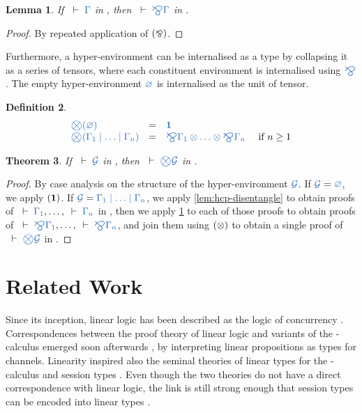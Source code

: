 \documentclass[copyright,creativecommons]{eptcs}
\newtheorem{lemma}{Lemma}[section]
\newtheorem{theorem}[lemma]{Theorem}
\newtheorem{definition}[lemma]{Definition}
\begin{document}
\begin{lemma}\label{lem:cp-bigparr}
  If $\seq{\Gamma}$ in \cp, then $\seq{\bigparr\Gamma}$ in \cp.
\end{lemma} 
\begin{proof}
  By repeated application of $(\mathbin{\bindnasrepma})$.
\end{proof}\noindent
Furthermore, a hyper-environment can be internalised as a type by collapsing it as a series of tensors, where each constituent environment is internalised using $\ty{\bigparr}$. The empty hyper-environment $\ty{\emptyhypercontext}$ is internalised as the unit of tensor.
\begin{definition}\label{def:bigtens}
  \[
  \begin{array}{lcll}
    \ty{\bigtens(\emptyhypercontext)}
    & = & \ty{\one}
    \\
    \ty{\bigtens(\Gamma_1 \hsep \dots \hsep \Gamma_n)}
    & = & \ty{\bigparr\Gamma_1 \tens \dots \tens \bigparr\Gamma_n}
    & \text{ if } n \geq 1
  \end{array}
  \]
\end{definition}\noindent

\begin{theorem}\label{thm:hcp2cp-bigtens}
  If $\seq{\mathcal{G}}$ in \hcp, then $\seq{\bigtens\mathcal{G}}$ in \cp.
\end{theorem} 
\begin{proof}
  By case analysis on the structure of the hyper-environment $\ty{\mathcal{G}}$.
  If $\ty{\mathcal{G}} = \ty{\emptyhypercontext}$, we apply $(\mathbf{1})$.
  If $\ty{\mathcal{G}} = \ty{\Gamma_1 \hsep \dots \hsep \Gamma_n}$, we apply \cref{lem:hcp-disentangle} to obtain proofs of $\seq{\Gamma_1}, \dots, \seq{\Gamma_n}$ in \cp, then we apply \cref{lem:cp-bigparr} to each of those proofs to obtain proofs of $\seq{\bigparr\Gamma_1}, \dots, \seq{\bigparr\Gamma_n}$, and join them using $(\otimes)$ to obtain a single proof of $\seq{\bigtens\mathcal{G}}$ in \cp.
\end{proof}\noindent

\section{Related Work}
\label{sec:related-work}

Since its inception, linear logic has been described as the logic of concurrency \cite{girard1987}. Correspondences between the proof theory of linear logic and variants of the \textpi-calculus emerged soon afterwards \cite{abramsky1994,bellin1994}, by interpreting linear propositions as types for channels. Linearity inspired also the seminal theories of linear types for the \textpi-calculus \cite{kobayashi1999} and session types \cite{honda1998}. Even though the two theories do not have a direct correspondence with linear logic, the link is still strong enough that session types can be encoded into linear types \cite{dardha2017}.
\end{document}

